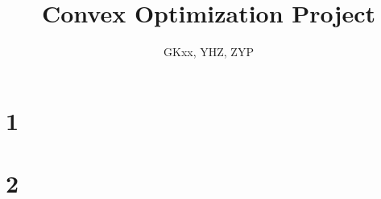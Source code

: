 \documentclass[11pt]{article}
\title{Convex Optimization Project}
\author{GKxx, YHZ, ZYP}
\begin{document}
\maketitle

\tableofcontents

\section{1}

\section{2}
\end{document}
